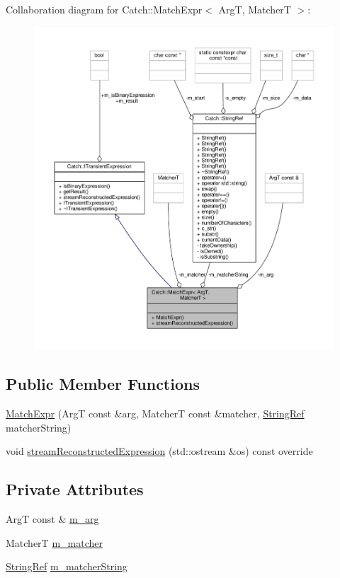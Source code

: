 Collaboration diagram for Catch\-:\-:Match\-Expr$<$ Arg\-T, Matcher\-T $>$\-:
\nopagebreak
\begin{figure}[H]
\begin{center}
\leavevmode
\includegraphics[width=350pt]{class_catch_1_1_match_expr__coll__graph}
\end{center}
\end{figure}
\subsection*{Public Member Functions}
\begin{DoxyCompactItemize}
\item 
\hyperlink{class_catch_1_1_match_expr_ab5b9ecc4fb9e91f5f48756e75affe93d}{Match\-Expr} (Arg\-T const \&arg, Matcher\-T const \&matcher, \hyperlink{class_catch_1_1_string_ref}{String\-Ref} matcher\-String)
\item 
void \hyperlink{class_catch_1_1_match_expr_ad3e41adb597750b2219bb37e51185629}{stream\-Reconstructed\-Expression} (std\-::ostream \&os) const override
\end{DoxyCompactItemize}
\subsection*{Private Attributes}
\begin{DoxyCompactItemize}
\item 
Arg\-T const \& \hyperlink{class_catch_1_1_match_expr_afb77e2fbf49f956d27f8617a70cf7118}{m\-\_\-arg}
\item 
Matcher\-T \hyperlink{class_catch_1_1_match_expr_a4dea78586dd2b3268b4a186e7c0adbe2}{m\-\_\-matcher}
\item 
\hyperlink{class_catch_1_1_string_ref}{String\-Ref} \hyperlink{class_catch_1_1_match_expr_a33ec706994f744ff1f4a549177ec08f9}{m\-\_\-matcher\-String}
\end{DoxyCompactItemize}
